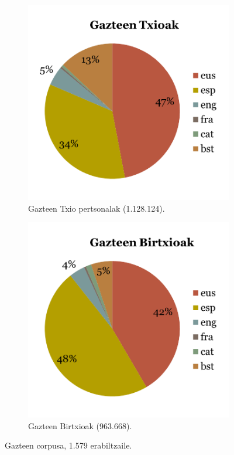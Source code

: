 \documentclass[information,article,submit,moreauthors,pdftex,10pt,a4paper]{Definitions/mdpi}
\begin{document}
\begin{figure}[H]
  \centering
  \begin{subfigure}[b]{0.48\linewidth}
    \includegraphics[width=\linewidth]{txio_gazte}
    \caption{Gazteen Txio pertsonalak (1.128.124).}
  \end{subfigure}
  \begin{subfigure}[b]{0.48\linewidth}
    \includegraphics[width=\linewidth]{birtxio_gazte}
    \caption{Gazteen Birtxioak (963.668).}
  \end{subfigure}
  \caption{Gazteen corpusa, 1.579 erabiltzaile.}
  \label{fig:gazte txbtx}
\end{figure}
\end{document}
